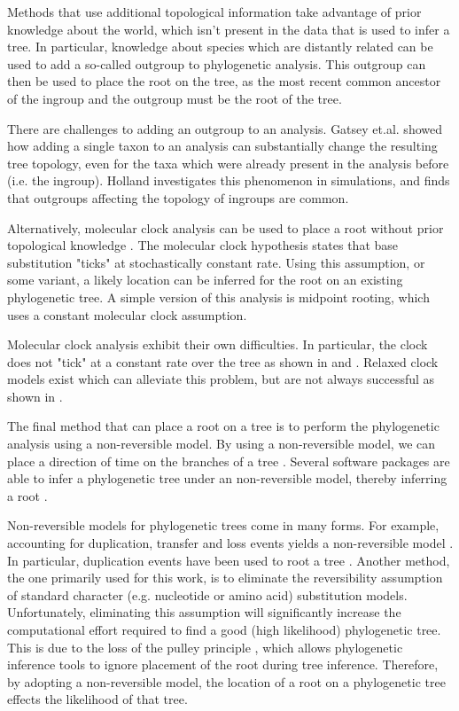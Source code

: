 \documentclass{article}
\begin{document}
Methods that use additional topological information take advantage of prior
knowledge about the world, which isn't present in the data that is used to
infer a tree.
In particular, knowledge about species which are distantly related can be used
to add a so-called outgroup to phylogenetic analysis.
This outgroup can then be used to place the root on the tree, as the most
recent common ancestor of the ingroup and the outgroup must be the root of the
tree.

There are challenges to adding an outgroup to an analysis.
Gatsey et.al.
\cite{gatesy_how_2007} showed how adding a single taxon to an analysis can
substantially change the resulting tree topology, even for the taxa which were
already present in the analysis before (i.e. the ingroup).
Holland \cite{holland_outgroup_2003} investigates this phenomenon in
simulations, and finds that outgroups affecting the topology of ingroups are
common.

Alternatively, molecular clock analysis can be used to place a root without
prior topological knowledge \cite{yang_computational_2006}.
The molecular clock hypothesis states that base substitution "ticks" at
stochastically constant rate.
Using this assumption, or some variant, a likely location can be inferred for
the root on an existing phylogenetic tree.
A simple version of this analysis is midpoint rooting, which uses a constant
molecular clock assumption.

Molecular clock analysis exhibit their own difficulties.
In particular, the clock does not "tick" at a constant rate over the tree as
shown in \cite{li_molecular_1987} and \cite{steiper_primate_2006}.
Relaxed clock models exist which can alleviate this problem, but are not always
successful as shown in \cite{battistuzzi_performance_2010}.

The final method that can place a root on a tree is to perform the phylogenetic
analysis using a non-reversible model.
By using a non-reversible model, we can place a direction of time on the
branches of a tree \cite{yap_rooting_2005}.
Several software packages are able to infer a phylogenetic tree under an
non-reversible model, thereby inferring a root \cite{nguyen_iq-tree:_2015}
\cite{ronquist_mrbayes_2003}.

Non-reversible models for phylogenetic trees come in many forms.
For example, accounting for duplication, transfer and loss events yields a
non-reversible model \cite{morel_generax:_2019}.
In particular, duplication events have been used to root a tree
\cite{emms_stride:_2017}.
Another method, the one primarily used for this work, is to eliminate the
reversibility assumption of standard character (e.g. nucleotide or amino acid)
substitution models.
Unfortunately, eliminating this assumption will significantly increase the
computational effort required to find a good (high likelihood) phylogenetic
tree.
This is due to the loss of the pulley principle
\cite{felsenstein_evolutionary_1981}, which allows phylogenetic inference tools
to ignore placement of the root during tree inference.
Therefore, by adopting a non-reversible model, the location of a root on a
phylogenetic tree effects the likelihood of that tree.
\end{document}
